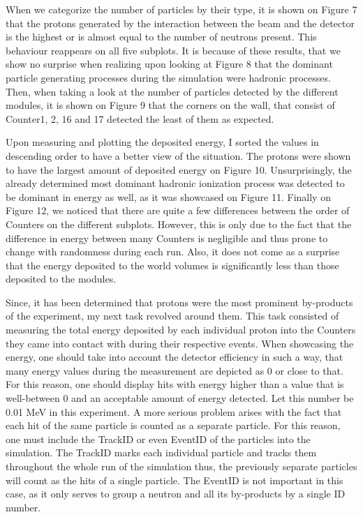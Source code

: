 \documentclass[12pt,twocolumn]{article}
\begin{document}
When we categorize the number of particles by their type, it is shown on Figure 7 that the protons generated by the interaction between the beam and the detector is the highest or is almost equal to the number of neutrons present. This behaviour reappears on all five subplots. It is because of these results, that we show no surprise when realizing upon looking at Figure 8 that the dominant particle generating processes during the simulation were hadronic processes. Then, when taking a look at the number of particles detected by the different modules, it is shown on Figure 9 that the corners on the wall, that consist of Counter1, 2, 16 and 17 detected the least of them as expected.

Upon measuring and plotting the deposited energy, I sorted the values in descending order to have a better view of the situation. The protons were shown to have the largest amount of deposited energy on Figure 10. Unsurprisingly, the already determined most dominant hadronic ionization process was detected to be dominant in energy as well, as it was showcased on Figure 11. Finally on Figure 12, we noticed that there are quite a few differences between the order of Counters on the different subplots. However, this is only due to the fact that the difference in energy between many Counters is negligible and thus prone to change with randomness during each run. Also, it does not come as a surprise that the energy deposited to the world volumes is significantly less than those deposited to the modules.

Since, it has been determined that protons were the most prominent by-products of the experiment, my next task revolved around them. This task consisted of measuring the total energy deposited by each individual proton into the Counters they came into contact with during their respective events. When showcasing the energy, one should take into account the detector efficiency in such a way, that many energy values during the measurement are depicted as 0 or close to that. For this reason, one should display hits with energy higher than a value that is well-between 0 and an acceptable amount of energy detected. Let this number be 0.01 MeV in this experiment. A more serious problem arises with the fact that each hit of the same particle is counted as a separate particle. For this reason, one must include the TrackID or even EventID of the particles into the simulation. The TrackID marks each individual particle and tracks them throughout the whole run of the simulation thus, the previously separate particles will count as the hits of a single particle. The EventID is not important in this case, as it only serves to group a neutron and all its by-products by a single ID number.
\end{document}

